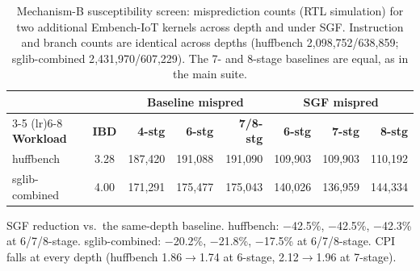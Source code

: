 \documentclass[acmsmall,nonacm,screen]{acmart}
\begin{document}
\begin{table}[h]
\centering
\caption{Mechanism-B susceptibility screen: misprediction counts (RTL simulation) for two additional Embench-IoT kernels across depth and under SGF. Instruction and branch counts are identical across depths (huffbench 2{,}098{,}752/638{,}859; sglib-combined 2{,}431{,}970/607{,}229). The 7- and 8-stage baselines are equal, as in the main suite.}
\label{tab:screen}
\small
\begin{tabular}{@{}l c rrr rrr@{}}
\toprule
& & \multicolumn{3}{c}{\textbf{Baseline mispred}} & \multicolumn{3}{c}{\textbf{SGF mispred}} \\
\cmidrule(lr){3-5} \cmidrule(lr){6-8}
\textbf{Workload} & \textbf{IBD} & \textbf{4-stg} & \textbf{6-stg} & \textbf{7/8-stg} & \textbf{6-stg} & \textbf{7-stg} & \textbf{8-stg} \\
\midrule
huffbench      & 3.28 & 187{,}420 & 191{,}088 & 191{,}090 & 109{,}903 & 109{,}903 & 110{,}192 \\
sglib-combined & 4.00 & 171{,}291 & 175{,}477 & 175{,}043 & 140{,}026 & 136{,}959 & 144{,}334 \\
\bottomrule
\end{tabular}

\vspace{2mm}
{\footnotesize SGF reduction vs.\ the same-depth baseline. huffbench: $-$42.5\%, $-$42.5\%, $-$42.3\% at 6/7/8-stage. sglib-combined: $-$20.2\%, $-$21.8\%, $-$17.5\% at 6/7/8-stage. CPI falls at every depth (huffbench 1.86$\to$1.74 at 6-stage, 2.12$\to$1.96 at 7-stage).}
\end{table}
\end{document}
